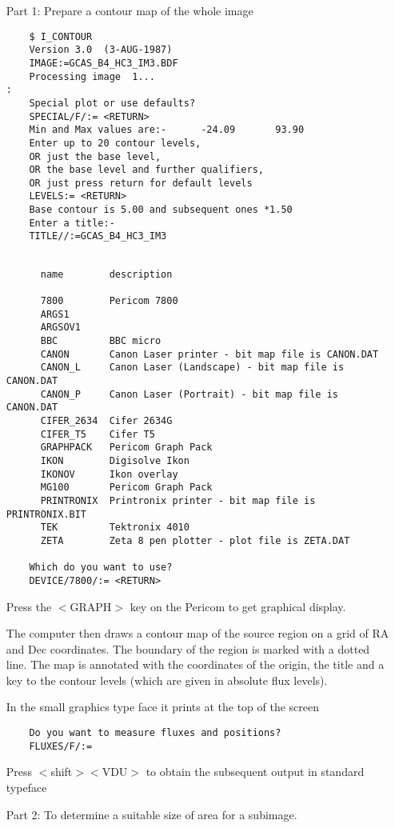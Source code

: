 \begin{itemize}
\item [Part 1:] Prepare a contour map of the whole image
\begin{verbatim}
    $ I_CONTOUR
    Version 3.0  (3-AUG-1987)
    IMAGE:=GCAS_B4_HC3_IM3.BDF
    Processing image  1...                                                   :
    Special plot or use defaults?
    SPECIAL/F/:= <RETURN>
    Min and Max values are:-      -24.09       93.90
    Enter up to 20 contour levels,
    OR just the base level,
    OR the base level and further qualifiers,
    OR just press return for default levels
    LEVELS:= <RETURN>
    Base contour is 5.00 and subsequent ones *1.50
    Enter a title:-
    TITLE//:=GCAS_B4_HC3_IM3
\end{verbatim}
\pagebreak
\begin{verbatim}

      name        description

      7800        Pericom 7800
      ARGS1
      ARGSOV1
      BBC         BBC micro
      CANON       Canon Laser printer - bit map file is CANON.DAT
      CANON_L     Canon Laser (Landscape) - bit map file is CANON.DAT
      CANON_P     Canon Laser (Portrait) - bit map file is CANON.DAT
      CIFER_2634  Cifer 2634G
      CIFER_T5    Cifer T5
      GRAPHPACK   Pericom Graph Pack
      IKON        Digisolve Ikon
      IKONOV      Ikon overlay
      MG100       Pericom Graph Pack
      PRINTRONIX  Printronix printer - bit map file is PRINTRONIX.BIT
      TEK         Tektronix 4010
      ZETA        Zeta 8 pen plotter - plot file is ZETA.DAT

    Which do you want to use?
    DEVICE/7800/:= <RETURN>
\end{verbatim}
Press the $<$GRAPH$>$ key on the Pericom to get graphical display.

The computer then draws a contour map of the source region on a grid of RA and
Dec coordinates. The boundary of the region is marked with a dotted line. The
map is annotated with the coordinates of the origin, the title and a key to
the contour levels (which are given in absolute flux levels).

In the small graphics type face it prints at the top of the screen
\begin{verbatim}
    Do you want to measure fluxes and positions?
    FLUXES/F/:=
\end{verbatim}
Press $<$shift$>$$<$VDU$>$ to obtain the subsequent output in standard typeface
\item [Part 2:] To determine a suitable size of area for a subimage.


\end{itemize}
